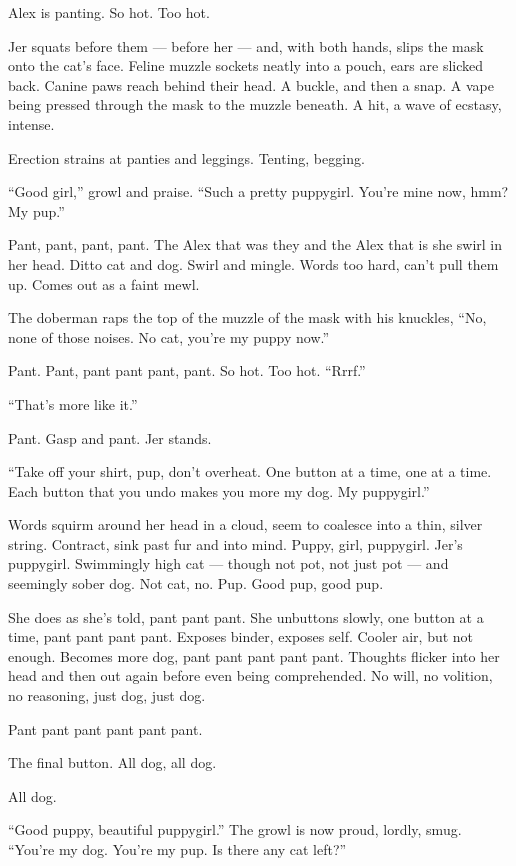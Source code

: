 \documentclass[12pt,letterpaper,oneside]{memoir}
\begin{document}
  Alex is panting. So hot. Too hot.

  Jer squats before them --- before her --- and, with both hands, slips
  the mask onto the cat's face. Feline muzzle sockets neatly into a pouch,
  ears are slicked back. Canine paws reach behind their head. A buckle,
  and then a snap. A vape being pressed through the mask to the muzzle
  beneath. A hit, a wave of ecstasy, intense.

  Erection strains at panties and leggings. Tenting, begging.

  ``Good girl,'' growl and praise. ``Such a pretty puppygirl. You're mine
  now, hmm? My pup.''

  Pant, pant, pant, pant. The Alex that was they and the Alex that is she
  swirl in her head. Ditto cat and dog. Swirl and mingle. Words too hard,
  can't pull them up. Comes out as a faint mewl.

  The doberman raps the top of the muzzle of the mask with his knuckles,
  ``No, none of those noises. No cat, you're my puppy now.''

  Pant. Pant, pant pant pant, pant. So hot. Too hot. ``Rrrf.''

  ``That's more like it.''

  Pant. Gasp and pant. Jer stands.

  ``Take off your shirt, pup, don't overheat. One button at a time, one at
  a time. Each button that you undo makes you more my dog. My puppygirl.''

  Words squirm around her head in a cloud, seem to coalesce into a thin,
  silver string. Contract, sink past fur and into mind. Puppy, girl,
  puppygirl. Jer's puppygirl. Swimmingly high cat --- though not pot, not
  just pot --- and seemingly sober dog. Not cat, no. Pup. Good pup, good
  pup.

  She does as she's told, pant pant pant. She unbuttons slowly, one button
  at a time, pant pant pant pant. Exposes binder, exposes self. Cooler
  air, but not enough. Becomes more dog, pant pant pant pant pant.
  Thoughts flicker into her head and then out again before even being
  comprehended. No will, no volition, no reasoning, just dog, just dog.

  Pant pant pant pant pant pant.

  The final button. All dog, all dog.

  All dog.

  ``Good puppy, beautiful puppygirl.'' The growl is now proud, lordly,
  smug. ``You're my dog. You're my pup. Is there any cat left?''
\end{document}
